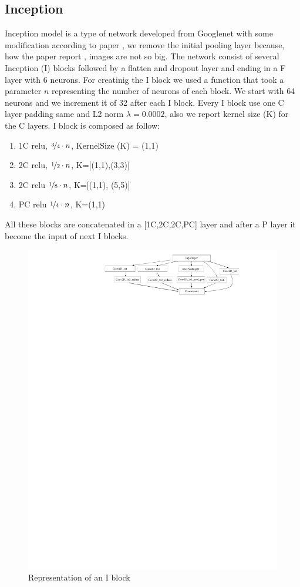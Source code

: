 \documentclass[10pt,twocolumn,letterpaper]{article}
\begin{document}
\subsection*{Inception}
Inception model is a type of network developed from Googlenet \cite{13} with some modification according to paper \cite{147}, we remove the initial pooling layer because, how the paper report \cite{147}, images are not so big. The network consist of several Inception (I) blocks followed by a flatten and dropout layer and ending in a F layer with 6 neurons. For creatinig the I block we used a function that took a parameter $n$ representing the number of neurons of each block. We start with 64 neurons and we increment it of 32 after each I block. Every I block  use one C layer padding same and L2 norm $\lambda=0.0002$, also we report kernel size (K) for the C layers. I block is composed as follow:
\begin{enumerate}[noitemsep]%
   \item 1C relu, $\nicefrac{3}{4}\cdot n$, KernelSize (K) = (1,1)
   \item 2C relu, $\nicefrac{1}{2}\cdot n$, K=[(1,1),(3,3)]
   \item 2C relu $\nicefrac{1}{8}\cdot n$, K=[(1,1), (5,5)]
   \item PC relu $\nicefrac{1}{4}\cdot n$, K=(1,1)
\end{enumerate}
All these blocks are concatenated in a [1C,2C,2C,PC] layer and after a P layer it become the input of next I blocks.
\begin{figure}[h]
   \centering
   \includegraphics[width=1\linewidth]{./immagini/m_inception_v0.pdf}
   \caption{Representation of an I block}
\end{figure}
\newpage
\end{document}
